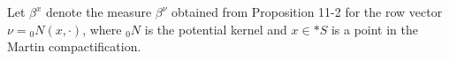 Let $\beta^x$ denote the measure $\beta^\nu$ obtained from Proposition 11-2 for the row vector $\nu = {}_0N(x, \cdot)$, where ${}_0N$ is the potential kernel and $x \in *S$ is a point in the Martin compactification.
